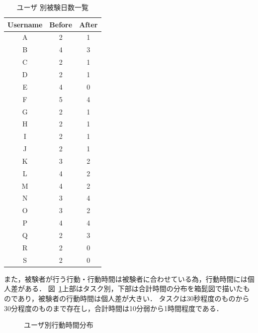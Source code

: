\begin{table}[ht]
\begin{center}
 \caption{ユーザ 別被験日数一覧}
\begin{tabular}{|c|c|c|} \hline
Username& Before& After \\\hline
A& 2&1 \\\hline
B& 4&3 \\\hline
C& 2&1 \\\hline
D& 2&1 \\\hline
E& 4&0 \\\hline
F& 5&4 \\\hline
G& 2&1 \\\hline
H& 2&1 \\\hline
I& 2&1 \\\hline
J& 2&1 \\\hline
K& 3&2 \\\hline
L& 4&2 \\\hline
M& 4&2 \\\hline
N& 3&4 \\\hline
O& 3&2 \\\hline
P& 4&4 \\\hline
Q& 2&3 \\\hline
R& 2&0 \\\hline
S& 2&0 \\\hline
\end{tabular}
  \label{tb:day}
\end{center}
\end{table}

また，被験者が行う行動・行動時間は被験者に合わせている為，行動時間には個人差がある．
図~\ref{fig:day}上部はタスク別，下部は合計時間の分布を箱髭図で描いたものであり，被験者の行動時間は個人差が大きい．
タスクは30秒程度のものから30分程度のものまで存在し，合計時間は10分弱から1時間程度である．

\begin{figure}[ht]
	\begin{center}
		\caption{ユーザ別行動時間分布}
		\label{fig:day}
	\end{center}
\end{figure}

